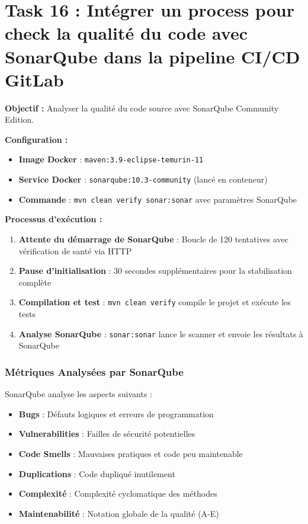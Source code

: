 \documentclass[10pt,a4paper]{article}
\begin{document}
\section{Task 16 : Intégrer un process pour check la qualité du code avec SonarQube dans la pipeline CI/CD GitLab}


\textbf{Objectif :} Analyser la qualité du code source avec SonarQube Community Edition.

\textbf{Configuration :}

\begin{itemize}
    \item \textbf{Image Docker} : \texttt{maven:3.9-eclipse-temurin-11}
    \item \textbf{Service Docker} : \texttt{sonarqube:10.3-community} (lancé en conteneur)
    \item \textbf{Commande} : \texttt{mvn clean verify sonar:sonar} avec paramètres SonarQube
\end{itemize}

\textbf{Processus d'exécution :}

\begin{enumerate}
    \item \textbf{Attente du démarrage de SonarQube} : Boucle de 120 tentatives avec vérification de santé via HTTP
    \item \textbf{Pause d'initialisation} : 30 secondes supplémentaires pour la stabilisation complète
    \item \textbf{Compilation et test} : \texttt{mvn clean verify} compile le projet et exécute les tests
    \item \textbf{Analyse SonarQube} : \texttt{sonar:sonar} lance le scanner et envoie les résultats à SonarQube
\end{enumerate}

\subsubsection{Métriques Analysées par SonarQube}

SonarQube analyse les aspects suivants :

\begin{itemize}
    \item \textbf{Bugs} : Défauts logiques et erreurs de programmation
    \item \textbf{Vulnerabilities} : Failles de sécurité potentielles
    \item \textbf{Code Smells} : Mauvaises pratiques et code peu maintenable
    \item \textbf{Duplications} : Code dupliqué inutilement
    \item \textbf{Complexité} : Complexité cyclomatique des méthodes
    \item \textbf{Maintenabilité} : Notation globale de la qualité (A-E)
\end{itemize}
\end{document}
